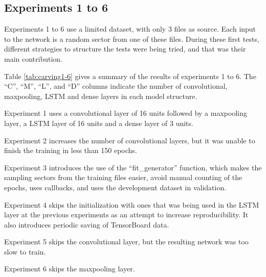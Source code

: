 \subsection{Experiments 1 to 6}

Experiments 1 to 6 use a limited dataset, with only 3 files as source. Each input to the network is a random sector from one of these files. During these first tests, different strategies to structure the tests were being tried, and that was their main contribution.

Table \ref{tab:carving1-6} gives a summary of the results of experiments 1 to 6. The ``C'', ``M'', ``L'', and ``D'' columns indicate the number of convolutional, maxpooling, LSTM and dense layers in each model structure.


Experiment 1 uses a convolutional layer of 16 units followed by a maxpooling layer, a LSTM layer of 16 units and a dense layer of 3 units.

Experiment 2 increases the number of convolutional layers, but it was unable to finish the training in less than 150 epochs.

Experiment 3 introduces the use of the ``fit\_generator'' function, which makes the sampling sectors from the training files easier, avoid manual counting of the epochs, uses callbacks, and uses the development dataset in validation.

Experiment 4 skips the initialization with ones that was being used in the LSTM layer at the previous experiments as an attempt to increase reproducibility. It also introduces periodic saving of TensorBoard data.

Experiment 5 skips the convolutional layer, but the resulting network was too slow to train.

Experiment 6 skips the maxpooling layer.




